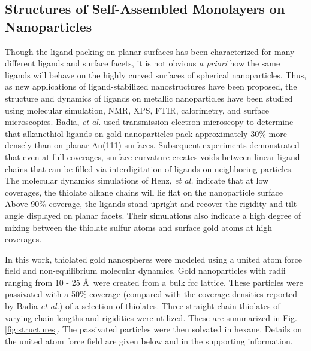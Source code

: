 \documentclass[aps,jcp,preprint,showpacs,superscriptaddress,groupedaddress]{revtex4-1}  %
\begin{document}
\subsection{Structures of Self-Assembled Monolayers on Nanoparticles}

Though the ligand packing on planar surfaces has been characterized
for many different ligands and surface facets, it is not obvious
\emph{a priori} how the same ligands will behave on the highly curved
surfaces of spherical nanoparticles. Thus, as new applications of
ligand-stabilized nanostructures have been proposed, the structure and
dynamics of ligands on metallic nanoparticles have been studied using
molecular simulation,\cite{Henz:2008qf} NMR, XPS, FTIR,
calorimetry, and surface
microscopies.\cite{Badia1996:2,Badia1996,Badia1997:2,Badia1997,Badia2000}
Badia, \textit{et al.} used transmission electron microscopy to
determine that alkanethiol ligands on gold nanoparticles pack
approximately 30\% more densely than on planar Au(111)
surfaces.\cite{Badia1996:2} Subsequent experiments demonstrated that
even at full coverages, surface curvature creates voids between linear
ligand chains that can be filled via interdigitation of ligands on
neighboring particles.\cite{Badia1996} The molecular dynamics
simulations of Henz, \textit{et al.} indicate that at low coverages,
the thiolate alkane chains will lie flat on the nanoparticle
surface\cite{Henz:2008qf} Above 90\% coverage, the ligands
stand upright and recover the rigidity and tilt angle displayed on
planar facets. Their simulations also indicate a high degree of mixing
between the thiolate sulfur atoms and surface gold atoms at high
coverages.

In this work, thiolated gold nanospheres were modeled using a united
atom force field and non-equilibrium molecular dynamics. Gold
nanoparticles with radii ranging from 10 - 25 \AA\ were created from a
bulk fcc lattice.  These particles were passivated with a 50\%
coverage (compared with the coverage densities reported by Badia
\textit{et al.}) of a selection of thiolates.  Three straight-chain
thiolates of varying chain lengths and rigidities were utilized.
These are summarized in Fig. \ref{fig:structures}.  The passivated
particles were then solvated in hexane.  Details on the united atom
force field are given below and in the supporting information.
\end{document}
